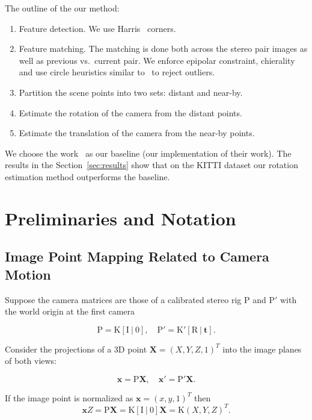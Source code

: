 \documentclass{bmvc2k}
\begin{document}
The outline of the our method:
\begin{enumerate}
\item Feature detection.  We use Harris~\cite{Harris1987} corners.
\item Feature matching. The matching is done both across the stereo
  pair images as well as previous vs.\ current pair.  We enforce
  epipolar constraint, chierality and use circle heuristics similar
  to~\cite{Geiger2011} to reject outliers.
\item Partition the scene points into two sets: distant and near-by.
\item Estimate the rotation of the camera from the distant points.
\item Estimate the translation of the camera from the near-by points.
\end{enumerate}

We choose the work~\cite{Geiger2011} as our baseline (our
implementation of their work).  The results in the
Section~\ref{sec:results} show that on the KITTI dataset our rotation
estimation method outperforms the baseline.

\section{Preliminaries and Notation}

\subsection{Image Point Mapping Related to Camera Motion}

Suppose the camera matrices are those of a calibrated stereo rig
$\mathrm{P}$ and $\mathrm{P}'$ with the world origin at the first
camera

\begin{equation}
\mathrm{P = K[I\ |\ 0],\quad P'=K'[R\ |\ \mathbf{t}]}.
\end{equation}

Consider the projections of a 3D point $\mathbf{X}=(X,Y,Z,1)^T$ into the image
planes of both views:

\begin{equation}
\mathrm{\mathbf{x} = P\mathbf{X}, \quad \mathbf{x}' = P'\mathbf{X}}.
\end{equation}

If the image point is normalized as $\mathbf{x} = (x,y,1)^T$ then
\[
\mathbf{x}Z = \mathrm{P\mathbf{X} = K[I\ |\ 0]\mathbf{X} = K}(X,Y,Z)^T.
\]
\end{document}
